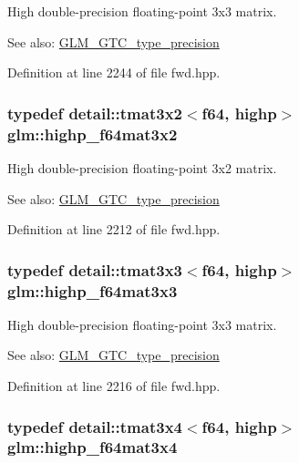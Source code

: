 High double-precision floating-point 3x3 matrix. \begin{Desc}
\item[See also:]\hyperlink{group__gtc__type__precision}{GLM\_\-GTC\_\-type\_\-precision} \end{Desc}


Definition at line 2244 of file fwd.hpp.\hypertarget{group__gtc__type__precision_g5cdc9d6fb9ce07e5485c4e2db919ce7e}{
\subsubsection[highp\_\-f64mat3x2]{\setlength{\rightskip}{0pt plus 5cm}typedef detail::tmat3x2$<$f64, highp$>$ {\bf glm::highp\_\-f64mat3x2}}}
\label{group__gtc__type__precision_g5cdc9d6fb9ce07e5485c4e2db919ce7e}


High double-precision floating-point 3x2 matrix. \begin{Desc}
\item[See also:]\hyperlink{group__gtc__type__precision}{GLM\_\-GTC\_\-type\_\-precision} \end{Desc}


Definition at line 2212 of file fwd.hpp.\hypertarget{group__gtc__type__precision_gf520a9307867c632408029a53af3e375}{
\subsubsection[highp\_\-f64mat3x3]{\setlength{\rightskip}{0pt plus 5cm}typedef detail::tmat3x3$<$f64, highp$>$ {\bf glm::highp\_\-f64mat3x3}}}
\label{group__gtc__type__precision_gf520a9307867c632408029a53af3e375}


High double-precision floating-point 3x3 matrix. \begin{Desc}
\item[See also:]\hyperlink{group__gtc__type__precision}{GLM\_\-GTC\_\-type\_\-precision} \end{Desc}


Definition at line 2216 of file fwd.hpp.\hypertarget{group__gtc__type__precision_g4144f547189dd7e52b4dd282f41a1cd1}{
\subsubsection[highp\_\-f64mat3x4]{\setlength{\rightskip}{0pt plus 5cm}typedef detail::tmat3x4$<$f64, highp$>$ {\bf glm::highp\_\-f64mat3x4}}}
\label{group__gtc__type__precision_g4144f547189dd7e52b4dd282f41a1cd1}


